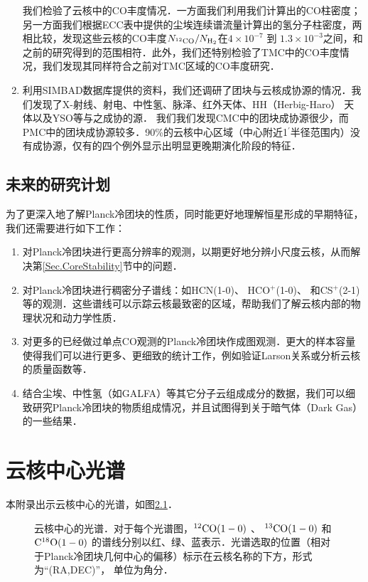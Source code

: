 \documentclass[UTF8, nocolorlinks]{pkuthss}
\newcommand{\coaa}{$\rm^{12}CO(1-0)$ }
\newcommand{\cobb}{$\rm^{13}CO(1-0)$ }
\newcommand{\cocc}{$\rm C^{18}O(1-0)$ }
\newcommand{\arcmin}{$^{\prime}$}
\begin{document}
\begin{enumerate}
	    	我们检验了云核中的CO丰度情况．一方面我们利用我们计算出的CO柱密度；另一方面我们根据ECC表中提供的尘埃连续谱流量计算出的氢分子柱密度，两相比较，发现这些云核的CO丰度$N_{\rm^{12}CO}/N_{\rm H_{2}}$在$4\times 10^{-7}$ 到 $1.3\times 10^{-3 }$之间，和之前的研究得到的范围相符\supercite{1988ApJ...334..771V}．此外，我们还特别检验了TMC中的CO丰度情况，我们发现其同样符合之前对TMC区域的CO丰度研究\supercite{1982ApJ...262..590F}．
	    \item
	    	利用SIMBAD数据库提供的资料，我们还调研了团块与云核成协源的情况．我们发现了X-射线、射电、中性氢、脉泽、红外天体、HH（Herbig-Haro） 天体以及YSO等与之成协的源． 我们我们发现CMC中的团块成协源很少，而PMC中的团块成协源较多．90\%的云核中心区域（中心附近1\arcmin 半径范围内）没有成协源，仅有的四个例外显示出明显更晚期演化阶段的特征．
    	\end{enumerate}
	\section{未来的研究计划}
		为了更深入地了解Planck冷团块的性质，同时能更好地理解恒星形成的早期特征，我们还需要进行如下工作：
		\begin{enumerate}
		 \item
		 	对Planck冷团块进行更高分辨率的观测，以期更好地分辨小尺度云核，从而解决第\ref{Sec.CoreStability}节中的问题．
	     \item 
	     	对Planck冷团块进行稠密分子谱线：如HCN(1-0)、 HCO$^+$(1-0)、 和CS$^+$(2-1)等的观测．这些谱线可以示踪云核最致密的区域，帮助我们了解云核内部的物理状况和动力学性质．
	     \item
	     	对更多的已经做过单点CO观测的Planck冷团块作成图观测．更大的样本容量使得我们可以进行更多、更细致的统计工作，例如验证Larson\supercite{1981MNRAS.194..809L}关系或分析云核的质量函数等．
	     \item
	     	结合尘埃、中性氢（如GALFA\supercite{2012ApJ...758...44S}）等其它分子云组成成分的数据，我们可以细致研究Planck冷团块的物质组成情况，并且试图得到关于暗气体\supercite{2005Sci...307.1292G}（Dark Gas）的一些结果．
    	\end{enumerate}
\appendix 

\printbibliography[heading = bibintoc]

\chapter{云核中心光谱}\label{App.Spectra}
	本附录出示云核中心的光谱，如图\ref{Fig.Spectra}．

	\begin{figure}[h]
		\caption{云核中心的光谱．对于每个光谱图，\coaa 、 \cobb 和 \cocc   的谱线分别以红、绿、蓝表示．光谱选取的位置（相对于Planck冷团块几何中心的偏移）标示在云核名称的下方，形式为“(RA,DEC)”， 单位为角分．\label{Fig.Spectra}}
	\end{figure}
		\vspace{-18mm}
\end{document}
